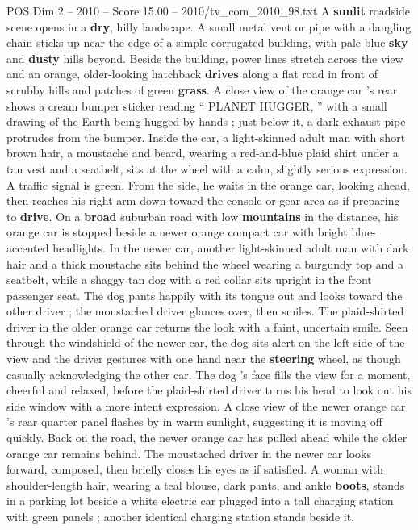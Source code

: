 \begin{textsample}{POS Dim 2 – 2010 – Score 15.00 – 2010/tv\_com\_2010\_98.txt}  \label{ex:f2_pos_055}
A \textbf{sunlit} roadside scene opens in a \textbf{dry}, hilly landscape.
A small metal vent or pipe with a dangling chain sticks up near the edge of a simple corrugated building, with pale blue \textbf{sky} and \textbf{dusty} hills beyond.
Beside the building, power lines stretch across the view and an orange, older-looking hatchback \textbf{drives} along a flat road in front of scrubby hills and patches of green \textbf{grass}.
A close view of the orange car ’s rear shows a cream bumper sticker reading “ PLANET HUGGER, ” with a small drawing of the Earth being hugged by hands ; just below it, a dark exhaust pipe protrudes from the bumper.
Inside the car, a light-skinned adult man with short brown hair, a moustache and beard, wearing a red-and-blue plaid shirt under a tan vest and a seatbelt, sits at the wheel with a calm, slightly serious expression.
A traffic signal is green.
From the side, he waits in the orange car, looking ahead, then reaches his right arm down toward the console or gear area as if preparing to \textbf{drive}.
On a \textbf{broad} suburban road with low \textbf{mountains} in the distance, his orange car is stopped beside a newer orange compact car with bright blue-accented headlights.
In the newer car, another light-skinned adult man with dark hair and a thick moustache sits behind the wheel wearing a burgundy top and a seatbelt, while a shaggy tan dog with a red collar sits upright in the front passenger seat.
The dog pants happily with its tongue out and looks toward the other driver ; the moustached driver glances over, then smiles.
The plaid-shirted driver in the older orange car returns the look with a faint, uncertain smile.
Seen through the windshield of the newer car, the dog sits alert on the left side of the view and the driver gestures with one hand near the \textbf{steering} wheel, as though casually acknowledging the other car.
The dog ’s face fills the view for a moment, cheerful and relaxed, before the plaid-shirted driver turns his head to look out his side window with a more intent expression.
A close view of the newer orange car ’s rear quarter panel flashes by in warm sunlight, suggesting it is moving off quickly.
Back on the road, the newer orange car has pulled ahead while the older orange car remains behind.
The moustached driver in the newer car looks forward, composed, then briefly closes his eyes as if satisfied.
A woman with shoulder-length hair, wearing a teal blouse, dark pants, and ankle \textbf{boots}, stands in a parking lot beside a white electric car plugged into a tall charging station with green panels ; another identical charging station stands beside it.

\end{textsample}
